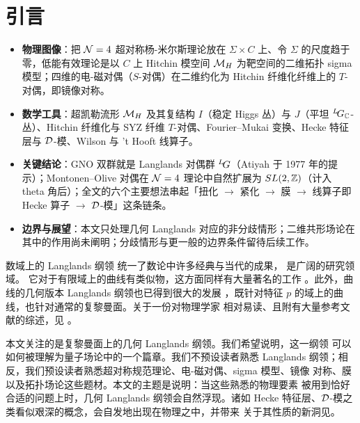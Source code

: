 
\section{引言}
\label{sec:intro}

\begin{keytakeaways}
\begin{itemize}[leftmargin=1.4em,itemsep=2pt,topsep=2pt]
\item \textbf{物理图像}：把 ${\EUN}=4$ 超对称杨-米尔斯理论放在 $\Sigma\times C$ 上、令 $\Sigma$ 的尺度趋于零，低能有效理论是以 $C$ 上 Hitchin 模空间 ${\EUM}_H$ 为靶空间的二维拓扑 sigma 模型；四维的电-磁对偶（$S$-对偶）在二维约化为 Hitchin 纤维化纤维上的 $T$-对偶，即镜像对称。
\item \textbf{数学工具}：超凯勒流形 ${\EUM}_H$ 及其复结构 $I$（稳定 Higgs 丛）与 $J$（平坦 ${}^L\negthinspace G_{\Bbb{C}}$-丛）、Hitchin 纤维化与 SYZ 纤维 $T$-对偶、Fourier--Mukai 变换、Hecke 特征层与 ${\cal D}$-模、Wilson 与 't Hooft 线算子。
\item \textbf{关键结论}：GNO 双群就是 Langlands 对偶群 ${}^L\negthinspace G$（Atiyah 于 1977 年的提示）；Montonen--Olive 对偶在 ${\EUN}=4$ 理论中自然扩展为 $SL(2,\Bbb{Z})$（计入 theta 角后）；全文的六个主要想法串起「扭化 $\to$ 紧化 $\to$ 膜 $\to$ 线算子即 Hecke 算子 $\to$ ${\cal D}$-模」这条链条。
\item \textbf{边界与展望}：本文只处理几何 Langlands 对应的非分歧情形；二维共形场论在其中的作用尚未阐明；分歧情形与更一般的边界条件留待后续工作。
\end{itemize}
\end{keytakeaways}

 数域上的 Langlands 纲领 \cite{ref1} 统一了数论中许多经典与当代的成果，
是广阔的研究领域。
它对于有限域上的曲线有类似物，这方面同样有大量著名的工作 \cite{ref2,ref3}。此外，曲线的几何版本
Langlands 纲领也已得到很大的发展 
\cite{ref4,ref5,ref6,ref7,ref8}，既针对特征 $p$ 的域上的曲线，也针对通常的复黎曼面。关于一份对物理学家
相对易读、且附有大量参考文献的综述，见 \cite{ref9}。

 本文关注的是复黎曼面上的几何 Langlands 纲领。我们希望说明，这一纲领
可以如何被理解为量子场论中的一个篇章。我们不预设读者熟悉 Langlands
纲领；相反，我们预设读者熟悉超对称规范理论、电-磁对偶、sigma 模型、镜像
对称、膜以及拓扑场论这些题材。本文的主题是说明：当这些熟悉的物理要素
被用到恰好合适的问题上时，几何 Langlands 纲领会自然浮现。诸如 Hecke
特征层、${\cal D}$-模之类看似艰深的概念，会自发地出现在物理之中，并带来
关于其性质的新洞见。

